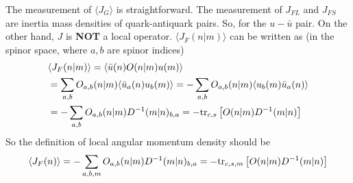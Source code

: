 The measurement of $\langle J_G \rangle$ is straightforward. The measurement of $J_{FL}$ and $J_{FS}$ are inertia mass densities of quark-antiquark pairs. So, for the $u-\bar{u}$ pair. On the other hand, $J$ is \textbf{NOT} a local operator. $\langle J_F(n|m) \rangle$ can be written as (in the spinor space, where $a,b$ are spinor indices)
\begin{equation}
\begin{split}
&\langle J_F(n|m) \rangle=\langle \bar{u}(n) O(n|m) u(m) \rangle\\
&=\sum _{a,b} O_{a,b}(n|m) \langle \bar{u}_a(n)  u_b(m) \rangle = -\sum _{a,b} O_{a,b}(n|m) \langle   u_b(m) \bar{u}_a(n)\rangle \\
&=-\sum _{a,b} O_{a,b}(n|m) D^{-1}(m|n)_{b,a}=-{\rm tr}_{c,s}\left[O(n|m) D^{-1}(m|n)\right]\\
\end{split}
\end{equation}
So the definition of local angular momentum density should be
\begin{equation}
\begin{split}
&\langle J_F(n) \rangle=-\sum _{a,b,m} O_{a,b}(n|m) D^{-1}(m|n)_{b,a}=-{\rm tr}_{c,s,m}\left[O(n|m) D^{-1}(m|n)\right]\\
\end{split}
\end{equation}

